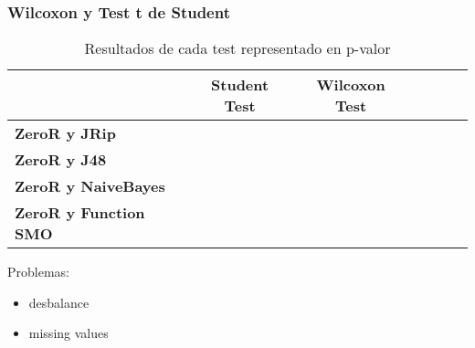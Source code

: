 \subsubsection{Wilcoxon y Test t de Student}

\begin{table}[H]
	\centering
	\begin{tabular}{|l|c|c|c|c|c|c|}
		\hline
		\textbf{}  & \textbf{Student Test} & \textbf{Wilcoxon Test} \\ \hline
		\textbf{ZeroR y JRip}  &  &  \\ \hline
		\textbf{ZeroR y J48}  &  &  \\ \hline
		\textbf{ZeroR y NaiveBayes}  &  &  \\ \hline
		\textbf{ZeroR y Function SMO}  &  & \\ \hline
	\end{tabular}
	\caption{Resultados de cada test representado en p-valor}
	\label{res_tests_wilcoxon_student}
\end{table}


Problemas:
\begin{itemize}
	\item desbalance
	\item missing values
\end{itemize}